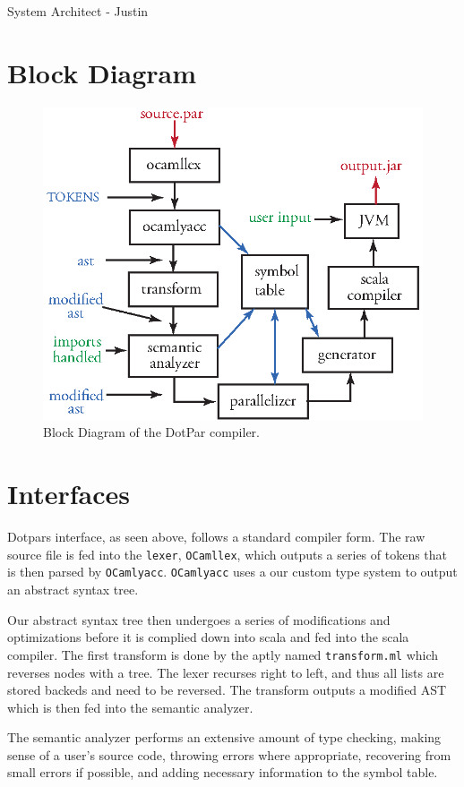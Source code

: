 System Architect - Justin
\section{Block Diagram}
\begin{figure}[H]
\centering
\includegraphics[scale=1]{blockdiagram.eps} 
\caption{Block Diagram of the DotPar compiler.}
\end{figure}

\section{Interfaces}
Dotpars interface, as seen above, follows a standard compiler form. The raw
source file is fed into the \verb=lexer=, \verb=OCamllex=, which outputs a series of tokens that is then
parsed by \verb=OCamlyacc=.  \verb=OCamlyacc= uses a our custom type system to output an abstract
syntax tree.

Our abstract syntax tree then undergoes a series of modifications and optimizations before it
is complied down into scala and fed into the scala compiler.  The first transform
is done by the aptly named \verb=transform.ml= which reverses nodes with a tree.  The lexer
recurses right to left, and thus all lists are stored backeds and need to be reversed.
The transform outputs a modified AST which is then fed into the semantic analyzer.

The semantic analyzer performs an extensive amount of type checking, making 
sense of a user's source code, throwing errors where appropriate, recovering from 
small errors if possible,  and adding necessary information to the symbol table.  

